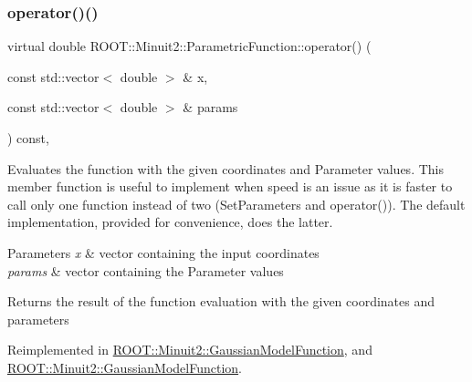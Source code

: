 \subsubsection{\texorpdfstring{operator()()}{operator()()}\hspace{0.1cm}{\footnotesize\ttfamily [6/6]}}
{\footnotesize\ttfamily virtual double R\+O\+O\+T\+::\+Minuit2\+::\+Parametric\+Function\+::operator() (\begin{DoxyParamCaption}\item[{const std\+::vector$<$ double $>$ \&}]{x,  }\item[{const std\+::vector$<$ double $>$ \&}]{params }\end{DoxyParamCaption}) const\hspace{0.3cm}{\ttfamily [inline]}, {\ttfamily [virtual]}}

Evaluates the function with the given coordinates and Parameter values. This member function is useful to implement when speed is an issue as it is faster to call only one function instead of two (Set\+Parameters and operator()). The default implementation, provided for convenience, does the latter.


\begin{DoxyParams}{Parameters}
{\em x} & vector containing the input coordinates\\
\hline
{\em params} & vector containing the Parameter values\\
\hline
\end{DoxyParams}
\begin{DoxyReturn}{Returns}
the result of the function evaluation with the given coordinates and parameters 
\end{DoxyReturn}


Reimplemented in \mbox{\hyperlink{classROOT_1_1Minuit2_1_1GaussianModelFunction_ab74ced8f50ef3831c8142de54877e726}{R\+O\+O\+T\+::\+Minuit2\+::\+Gaussian\+Model\+Function}}, and \mbox{\hyperlink{classROOT_1_1Minuit2_1_1GaussianModelFunction_ab74ced8f50ef3831c8142de54877e726}{R\+O\+O\+T\+::\+Minuit2\+::\+Gaussian\+Model\+Function}}.

